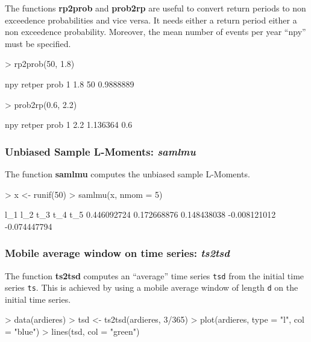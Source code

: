 \documentclass[a4paper]{article}
\numberwithin{equation}{section}
\theoremstyle{definition}
\begin{document}
The functions \textbf{rp2prob} and \textbf{prob2rp} are useful to
convert return periods to non exceedence probabilities and vice
versa. It needs either a return period either a non exceedence
probability. Moreover, the mean number of events per year ``npy'' must
be specified.
\begin{Schunk}
\begin{Sinput}
> rp2prob(50, 1.8)
\end{Sinput}
\begin{Soutput}
  npy retper      prob
1 1.8     50 0.9888889
\end{Soutput}
\begin{Sinput}
> prob2rp(0.6, 2.2)
\end{Sinput}
\begin{Soutput}
  npy   retper prob
1 2.2 1.136364  0.6
\end{Soutput}
\end{Schunk}

\subsubsection{Unbiased Sample L-Moments: \emph{samlmu}}

The function \textbf{samlmu} computes the unbiased sample L-Moments.
\begin{Schunk}
\begin{Sinput}
> x <- runif(50)
> samlmu(x, nmom = 5)
\end{Sinput}
\begin{Soutput}
         l_1          l_2          t_3          t_4          t_5 
 0.446092724  0.172668876  0.148438038 -0.008121012 -0.074447794 
\end{Soutput}
\end{Schunk}

\subsubsection{Mobile average window on time series: \emph{ts2tsd}}

The function \textbf{ts2tsd} computes an ``average'' time series
\verb|tsd| from the initial time series \verb|ts|. This is achieved by
using a mobile average window of length \verb|d| on the initial time
series.
\begin{Schunk}
\begin{Sinput}
> data(ardieres)
> tsd <- ts2tsd(ardieres, 3/365)
> plot(ardieres, type = "l", col = "blue")
> lines(tsd, col = "green")
\end{Sinput}
\end{Schunk}
\end{document}
